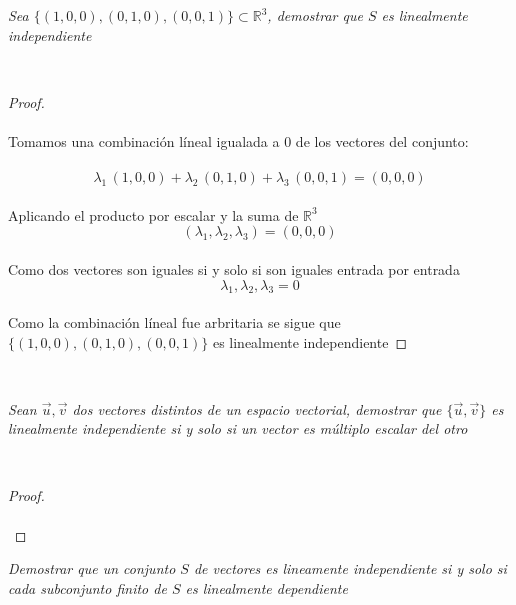 \documentclass[11pt,letterpaper]{article}
\newcommand{\R}{\mathbb{R}}
\begin{document}
\begin{tcolorbox}[
	title = \textcolor{black}{\textcolor{white}{Problema 8}},]
\textit{Sea $\{(1,0,0),(0,1,0),(0,0,1)\}\subset \R^3$, demostrar que $S$ es linealmente independiente
}
\end{tcolorbox}\,\\
\begin{proof}\,\\
    \,\\
    Tomamos una combinaci\'on l\'ineal igualada a $0$ de los vectores del conjunto:\,\\
    \,\\
    \begin{equation*}
        \lambda_1\,(1,0,0)+\lambda_2\,(0,1,0)+\lambda_3\,(0,0,1)=(0,0,0)
    \end{equation*}\,\\
    Aplicando el producto por escalar y la suma de $\R^3$\,\\
    \begin{equation*}
        (\lambda_1,\lambda_2,\lambda_3)=(0,0,0)
    \end{equation*}\,\\
    Como dos vectores son iguales si y solo si son iguales entrada por entrada\,\\
    \begin{equation*}
        \lambda_1,\lambda_2,\lambda_3=0
    \end{equation*}\,\\
    Como la combinaci\'on l\'ineal fue arbritaria se sigue que $\{(1,0,0),(0,1,0),(0,0,1)\}$ es linealmente independiente
\end{proof}\,\\
\begin{tcolorbox}[
	title = \textcolor{black}{\textcolor{white}{Problema 9}},]
\textit{Sean $\vec{u},\vec{v}$ dos vectores distintos de un espacio vectorial, demostrar que $\{\vec{u},\vec{v}\}$
es linealmente independiente si y solo si un vector es m\'ultiplo escalar del otro
}
\end{tcolorbox}\,\\
\begin{proof}\,\\
    \,\\
\end{proof}
\begin{tcolorbox}[
	title = \textcolor{black}{\textcolor{white}{Problema 10}},]
\textit{Demostrar que un conjunto $S$ de vectores es lineamente independiente si y solo si cada subconjunto finito de $S$ es linealmente dependiente 
}
\end{tcolorbox}\,\\
\end{document}
